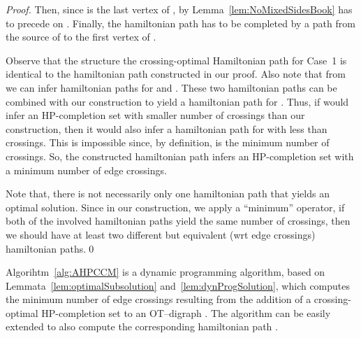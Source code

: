 \documentclass{myllncs-mixalis}
\begin{document}
\begin{proof}
Then, since  is the last vertex of , by
Lemma~\ref{lem:NoMixedSidesBook}  has to precede  on
. Finally, the hamiltonian path 
has to be completed by a path  from the source  of  to
the first vertex of .

Observe that the structure the crossing-optimal Hamiltonian path
 for Case~1 is identical to the hamiltonian path
constructed in our proof. Also note that from  we
can infer  hamiltonian paths for  and . These two
hamiltonian paths can be combined with our construction to yield a
hamiltonian path for . Thus, if  would
infer an HP-completion set with smaller number of crossings than our
construction, then it would also infer a hamiltonian path for 
with less than  crossings. This is impossible since, by
definition,  is the minimum number of crossings. So, the
constructed hamiltonian path infers an HP-completion set with a
minimum number of edge crossings.

Note that, there is not necessarily only one hamiltonian path that
yields an optimal solution. Since in our construction, we apply a
``minimum'' operator,  if both of the involved hamiltonian paths
yield the same number  of crossings, then we should have at least
two different but equivalent (wrt edge crossings) hamiltonian
paths.\qed
\end{proof}

Algorihtm~\ref{alg:AHPCCM} is a dynamic programming algorithm, based
on Lemmata~\ref{lem:optimalSubsolution}
and~\ref{lem:dynProgSolution}, which computes the minimum number of
edge crossings  resulting from the addition of a
crossing-optimal  HP-completion set  to an OT--digraph . The
algorithm can be easily extended to also compute the corresponding
hamiltonian path .
\end{document}
